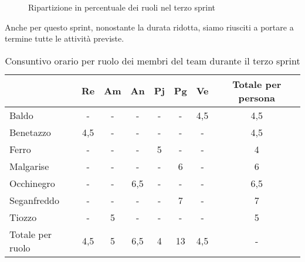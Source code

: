 \newblock
\begin{figure}[!h]
    \centering
    \caption{Ripartizione in percentuale dei ruoli nel terzo sprint}
    \label{fig:8}
\end{figure}

Anche per questo sprint, nonostante la durata ridotta, siamo riusciti a portare a termine tutte le attività previste.

\begin{table}[!h]
    \centering
    \begin{tabular}{ | l | c | c | c | c | c | c | c | }
        \hline
        \textbf{} & \textbf{Re} & \textbf{Am} & \textbf{An} & \textbf{Pj} & \textbf{Pg} & \textbf{Ve} & \textbf{Totale per persona} \\
        \hline
        Baldo            &  -   &  -   &  -   &  -   &  -   &  4,5 &  4,5 \\
        Benetazzo        &  4,5 &  -   &  -   &  -   &  -   &  -   &  4,5 \\
        Ferro            &  -   &  -   &  -   &  5   &  -   &  -   &  4   \\
        Malgarise        &  -   &  -   &  -   &  -   &  6   &  -   &  6   \\
        Occhinegro       &  -   &  -   &  6,5 &  -   &  -   &  -   &  6,5 \\
        Seganfreddo      &  -   &  -   &  -   &  -   &  7   &  -   &  7   \\
        Tiozzo           &  -   &  5   &  -   &  -   &  -   &  -   &  5   \\
        \hline
        Totale per ruolo &  4,5 &  5   &  6,5 &  4   & 13   &  4,5 &  -   \\
        \hline
    \end{tabular}
    \caption{Consuntivo orario per ruolo dei membri del team durante il terzo sprint}
    \label{tab:22}
\end{table}

